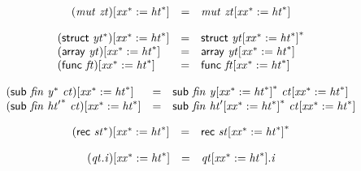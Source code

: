 $$
\begin{array}{@{}lcl@{}l@{}}
{({\mathit{mut}}~{\mathit{zt}})}{[{{\mathit{xx}}^\ast} := {{\mathit{ht}}^\ast}]} &=& {\mathit{mut}}~{{\mathit{zt}}}{[{{\mathit{xx}}^\ast} := {{\mathit{ht}}^\ast}]} &  \\
\end{array}
$$

$$
\begin{array}{@{}lcl@{}l@{}}
{(\mathsf{struct}~{{\mathit{yt}}^\ast})}{[{{\mathit{xx}}^\ast} := {{\mathit{ht}}^\ast}]} &=& \mathsf{struct}~{{{\mathit{yt}}}{[{{\mathit{xx}}^\ast} := {{\mathit{ht}}^\ast}]}^\ast} &  \\
{(\mathsf{array}~{\mathit{yt}})}{[{{\mathit{xx}}^\ast} := {{\mathit{ht}}^\ast}]} &=& \mathsf{array}~{{\mathit{yt}}}{[{{\mathit{xx}}^\ast} := {{\mathit{ht}}^\ast}]} &  \\
{(\mathsf{func}~{\mathit{ft}})}{[{{\mathit{xx}}^\ast} := {{\mathit{ht}}^\ast}]} &=& \mathsf{func}~{{\mathit{ft}}}{[{{\mathit{xx}}^\ast} := {{\mathit{ht}}^\ast}]} &  \\
\end{array}
$$

$$
\begin{array}{@{}lcl@{}l@{}}
{(\mathsf{sub}~{\mathit{fin}}~{{\mathit{y}}^\ast}~{\mathit{ct}})}{[{{\mathit{xx}}^\ast} := {{\mathit{ht}}^\ast}]} &=& \mathsf{sub}~{\mathit{fin}}~{{{\mathit{y}}}{[{{\mathit{xx}}^\ast} := {{\mathit{ht}}^\ast}]}^\ast}~{{\mathit{ct}}}{[{{\mathit{xx}}^\ast} := {{\mathit{ht}}^\ast}]} &  \\
{(\mathsf{sub}~{\mathit{fin}}~{{\mathit{ht}'}^\ast}~{\mathit{ct}})}{[{{\mathit{xx}}^\ast} := {{\mathit{ht}}^\ast}]} &=& \mathsf{sub}~{\mathit{fin}}~{{{\mathit{ht}'}}{[{{\mathit{xx}}^\ast} := {{\mathit{ht}}^\ast}]}^\ast}~{{\mathit{ct}}}{[{{\mathit{xx}}^\ast} := {{\mathit{ht}}^\ast}]} &  \\
\end{array}
$$

$$
\begin{array}{@{}lcl@{}l@{}}
{(\mathsf{rec}~{{\mathit{st}}^\ast})}{[{{\mathit{xx}}^\ast} := {{\mathit{ht}}^\ast}]} &=& \mathsf{rec}~{{{\mathit{st}}}{[{{\mathit{xx}}^\ast} := {{\mathit{ht}}^\ast}]}^\ast} &  \\
\end{array}
$$

$$
\begin{array}{@{}lcl@{}l@{}}
{({\mathit{qt}} . {\mathit{i}})}{[{{\mathit{xx}}^\ast} := {{\mathit{ht}}^\ast}]} &=& {{\mathit{qt}}}{[{{\mathit{xx}}^\ast} := {{\mathit{ht}}^\ast}]} . {\mathit{i}} &  \\
\end{array}
$$

